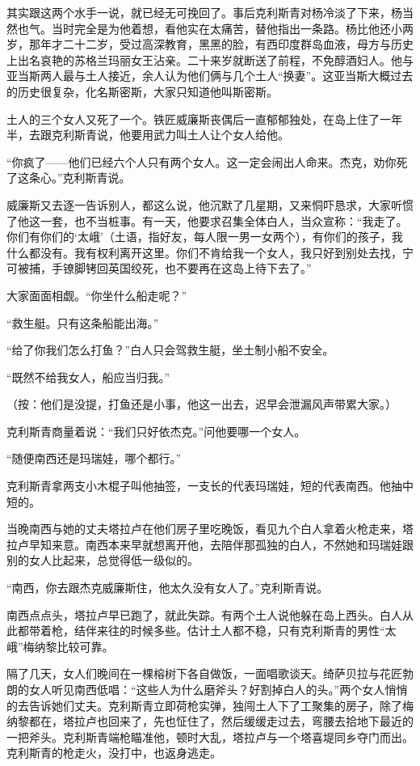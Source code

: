 \par 其实跟这两个水手一说，就已经无可挽回了。事后克利斯青对杨冷淡了下来，杨当然也气。当时完全是为他着想，看他实在太痛苦，替他指出一条路。杨比他还小两岁，那年才二十二岁，受过高深教育，黑黑的脸，有西印度群岛血液，母方与历史上出名哀艳的苏格兰玛丽女王沾亲。二十来岁就断送了前程，不免醇酒妇人。他与亚当斯两人最与土人接近，余人认为他们俩与几个土人“换妻”。这亚当斯大概过去的历史很复杂，化名斯密斯，大家只知道他叫斯密斯。
\par 土人的三个女人又死了一个。铁匠威廉斯丧偶后一直郁郁独处，在岛上住了一年半，去跟克利斯青说，他要用武力叫土人让个女人给他。
\par “你疯了——他们已经六个人只有两个女人。这一定会闹出人命来。杰克，劝你死了这条心。”克利斯青说。
\par 威廉斯又去逐一告诉别人，都这么说，他沉默了几星期，又来恫吓恳求，大家听惯了他这一套，也不当桩事。有一天，他要求召集全体白人，当众宣称：“我走了。你们有你们的‘太峨’（土语，指好友，每人限一男一女两个），有你们的孩子，我什么都没有。我有权利离开这里。你们不肯给我一个女人，我只好到别处去找，宁可被捕，手镣脚铐回英国绞死，也不要再在这岛上待下去了。”
\par 大家面面相觑。“你坐什么船走呢？”
\par “救生艇。只有这条船能出海。”
\par “给了你我们怎么打鱼？”白人只会驾救生艇，坐土制小船不安全。
\par “既然不给我女人，船应当归我。”
\par （按：他们是没提，打鱼还是小事，他这一出去，迟早会泄漏风声带累大家。）
\par 克利斯青商量着说：“我们只好依杰克。”问他要哪一个女人。
\par “随便南西还是玛瑞娃，哪个都行。”
\par 克利斯青拿两支小木棍子叫他抽签，一支长的代表玛瑞娃，短的代表南西。他抽中短的。
\par 当晚南西与她的丈夫塔拉卢在他们房子里吃晚饭，看见九个白人拿着火枪走来，塔拉卢早知来意。南西本来早就想离开他，去陪伴那孤独的白人，不然她和玛瑞娃跟别的女人比起来，总觉得低一级似的。
\par “南西，你去跟杰克威廉斯住，他太久没有女人了。”克利斯青说。
\par 南西点点头，塔拉卢早已跑了，就此失踪。有两个土人说他躲在岛上西头。白人从此都带着枪，结伴来往的时候多些。估计土人都不稳，只有克利斯青的男性“太峨”梅纳黎比较可靠。
\par 隔了几天，女人们晚间在一棵榕树下各自做饭，一面唱歌谈天。绮萨贝拉与花匠勃朗的女人听见南西低唱：“这些人为什么磨斧头？好割掉白人的头。”两个女人悄悄的去告诉她们丈夫。克利斯青立即荷枪实弹，独闯土人下了工聚集的房子，除了梅纳黎都在，塔拉卢也回来了，先也怔住了，然后缓缓走过去，弯腰去拾地下最近的一把斧头。克利斯青端枪瞄准他，顿时大乱，塔拉卢与一个塔喜堤同乡夺门而出。克利斯青的枪走火，没打中，也返身逃走。
